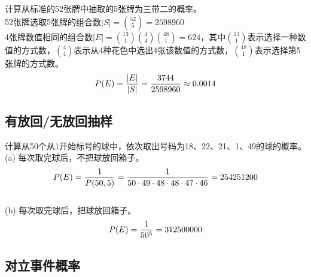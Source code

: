 \begin{tcolorbox}
	计算从标准的52张牌中抽取的5张牌为三带二的概率。\\
	52张牌选取5张牌的组合数$ |S| = {52 \choose 5} = 2598960 $\\
	4张牌数值相同的组合数$ |E| = {13 \choose 1}{4 \choose 4}{48 \choose 1} = 624 $，其中$ 13 \choose 1 $表示选择一种数值的方式数，$ 4 \choose 4 $表示从4种花色中选出4张该数值的方式数，$ 48 \choose 1 $表示选择第5张牌的方式数。\\
	$$
		P(E) = {|E| \over |S|} = {3744 \over 2598960} \approx 0.0014
	$$
\end{tcolorbox}

\vspace{0.5cm}

\subsection{有放回/无放回抽样}

\begin{tcolorbox}
	计算从50个从1开始标号的球中，依次取出号码为18、22、21、1、49的球的概率。\\
	(a) 每次取完球后，不把球放回箱子。\\
	$$
		P(E) = {1 \over P(50, 5)} = {1 \over {50 \cdot 49 \cdot 48 \cdot 48 \cdot 47 \cdot 46}} = 254251200
	$$
	\\
	(b) 每次取完球后，把球放回箱子。\\
	$$
		P(E) = {1 \over 50^5} = 312500000
	$$
\end{tcolorbox}

\vspace{0.5cm}

\subsection{对立事件概率}

